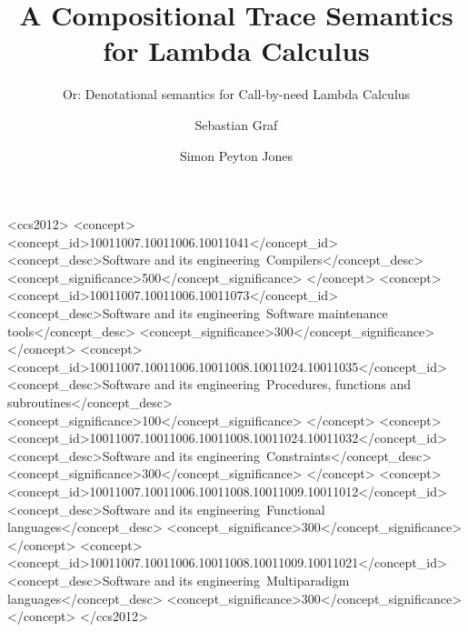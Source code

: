 \documentclass[acmsmall,review]{acmart}\settopmatter{printfolios=true,printccs=false,printacmref=false}
\begin{document}
\setlength{\pdfpageheight}{\paperheight}
\setlength{\pdfpagewidth}{\paperwidth}

\title{A Compositional Trace Semantics for Lambda Calculus}
\subtitle{Or: Denotational semantics for Call-by-need Lambda Calculus}

\author{Sebastian Graf}

\author{Simon Peyton Jones}


\newif\ifmain
\newif\ifappendix

\maintrue
\appendixfalse
\def\appendixonly{\mainfalse{}\appendixtrue{}}


\def\extended{\maintrue{}\appendixtrue{}}

\ifmain

\begin{abstract}
\end{abstract}

\begin{CCSXML}
<ccs2012>
   <concept>
       <concept_id>10011007.10011006.10011041</concept_id>
       <concept_desc>Software and its engineering~Compilers</concept_desc>
       <concept_significance>500</concept_significance>
       </concept>
   <concept>
       <concept_id>10011007.10011006.10011073</concept_id>
       <concept_desc>Software and its engineering~Software maintenance tools</concept_desc>
       <concept_significance>300</concept_significance>
       </concept>
   <concept>
       <concept_id>10011007.10011006.10011008.10011024.10011035</concept_id>
       <concept_desc>Software and its engineering~Procedures, functions and subroutines</concept_desc>
       <concept_significance>100</concept_significance>
       </concept>
   <concept>
       <concept_id>10011007.10011006.10011008.10011024.10011032</concept_id>
       <concept_desc>Software and its engineering~Constraints</concept_desc>
       <concept_significance>300</concept_significance>
       </concept>
   <concept>
       <concept_id>10011007.10011006.10011008.10011009.10011012</concept_id>
       <concept_desc>Software and its engineering~Functional languages</concept_desc>
       <concept_significance>300</concept_significance>
       </concept>
   <concept>
       <concept_id>10011007.10011006.10011008.10011009.10011021</concept_id>
       <concept_desc>Software and its engineering~Multiparadigm languages</concept_desc>
       <concept_significance>300</concept_significance>
       </concept>
 </ccs2012>
\end{CCSXML}
\end{document}
